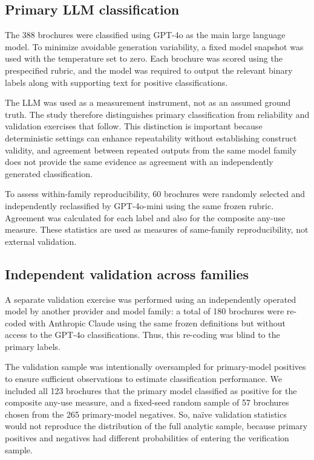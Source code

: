 \documentclass[utf8]{FrontiersinHarvard}
\begin{document}
\subsection{Primary LLM classification}

The 388 brochures were classified using GPT-4o as the main large language model. To minimize avoidable generation variability, a fixed model snapshot was used with the temperature set to zero. Each brochure was scored using the prespecified rubric, and the model was required to output the relevant binary labels along with supporting text for positive classifications.

The LLM was used as a measurement instrument, not as an assumed ground truth. The study therefore distinguishes primary classification from reliability and validation exercises that follow. This distinction is important because deterministic settings can enhance repeatability without establishing construct validity, and agreement between repeated outputs from the same model family does not provide the same evidence as agreement with an independently generated classification.

To assess within-family reproducibility, 60 brochures were randomly selected and independently reclassified by GPT-4o-mini using the same frozen rubric. Agreement was calculated for each label and also for the composite any-use measure. These statistics are used as measures of same-family reproducibility, not external validation.

\subsection{Independent validation across families}

A separate validation exercise was performed using an independently operated model by another provider and model family: a total of 180 brochures were re-coded with Anthropic Claude using the same frozen definitions but without access to the GPT-4o classifications. Thus, this re-coding was blind to the primary labels.

The validation sample was intentionally oversampled for primary-model positives to ensure sufficient observations to estimate classification performance. We included all 123 brochures that the primary model classified as positive for the composite any-use measure, and a fixed-seed random sample of 57 brochures chosen from the 265 primary-model negatives. So, na\"ive validation statistics would not reproduce the distribution of the full analytic sample, because primary positives and negatives had different probabilities of entering the verification sample.
\end{document}
